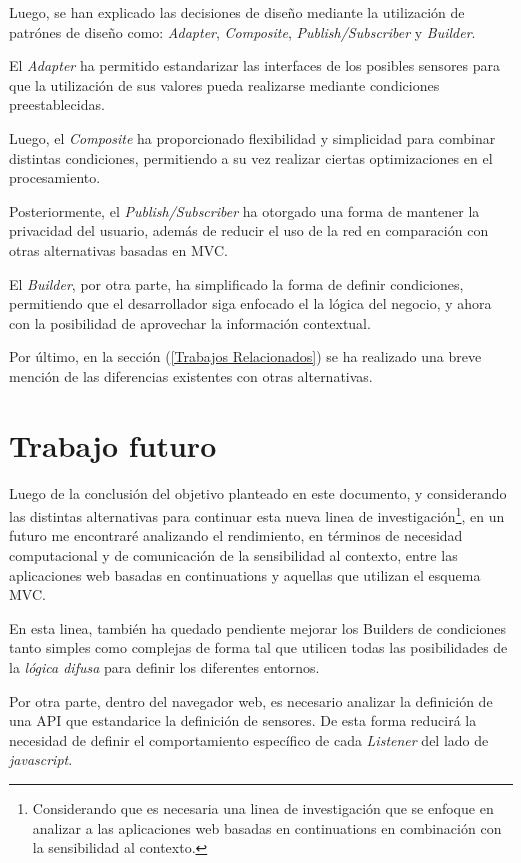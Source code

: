 Luego, se han explicado las decisiones de diseño mediante la utilización de patrónes de diseño como: \emph{Adapter}, \emph{Composite}, \emph{Publish/Subscriber} y \emph{Builder}.

El \emph{Adapter} ha permitido estandarizar las interfaces de los posibles sensores para que la utilización de sus valores pueda realizarse mediante condiciones preestablecidas.

Luego, el \emph{Composite} ha proporcionado flexibilidad y simplicidad para combinar distintas condiciones, permitiendo a su vez realizar ciertas optimizaciones en el procesamiento.

Posteriormente, el \emph{Publish/Subscriber} ha otorgado una forma de mantener la privacidad del usuario, además de reducir el uso de la red en comparación con otras alternativas basadas en MVC.

El \emph{Builder}, por otra parte, ha simplificado la forma de definir condiciones, permitiendo que el desarrollador siga enfocado el la lógica del negocio, y ahora con la posibilidad de aprovechar la información contextual.

Por último, en la sección  (\ref{Trabajos Relacionados}) se ha realizado una breve mención de las diferencias existentes con otras alternativas.


\section{Trabajo futuro}

Luego de la conclusión del objetivo planteado en este documento, y considerando las distintas alternativas para continuar esta nueva linea de investigación\footnote{Considerando que es necesaria una linea de investigación que se enfoque en analizar a las aplicaciones web basadas en continuations en combinación con la sensibilidad al contexto.}, en un futuro me encontraré analizando el rendimiento, en términos de necesidad computacional y de comunicación de la sensibilidad al contexto, entre las aplicaciones web basadas en continuations y aquellas que utilizan el esquema MVC.

En esta linea, también ha quedado pendiente mejorar los Builders de condiciones tanto simples como complejas de forma tal que utilicen todas las posibilidades de la \emph{lógica difusa} para definir los diferentes entornos.

Por otra parte, dentro del navegador web, es necesario analizar la definición de una API que estandarice la definición de sensores. De esta forma reducirá la necesidad de definir el comportamiento específico de cada \emph{Listener} del lado de \emph{javascript}.

